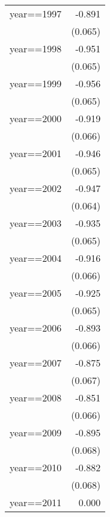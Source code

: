 \begin{table}[htbp]
\begin{tabular}{l*{1}{D{.}{.}{-1}}}
\addlinespace
year==1997          &      -0.891\sym{***}\\
                    &     (0.065)         \\
\addlinespace
year==1998          &      -0.951\sym{***}\\
                    &     (0.065)         \\
\addlinespace
year==1999          &      -0.956\sym{***}\\
                    &     (0.065)         \\
\addlinespace
year==2000          &      -0.919\sym{***}\\
                    &     (0.066)         \\
\addlinespace
year==2001          &      -0.946\sym{***}\\
                    &     (0.065)         \\
\addlinespace
year==2002          &      -0.947\sym{***}\\
                    &     (0.064)         \\
\addlinespace
year==2003          &      -0.935\sym{***}\\
                    &     (0.065)         \\
\addlinespace
year==2004          &      -0.916\sym{***}\\
                    &     (0.066)         \\
\addlinespace
year==2005          &      -0.925\sym{***}\\
                    &     (0.065)         \\
\addlinespace
year==2006          &      -0.893\sym{***}\\
                    &     (0.066)         \\
\addlinespace
year==2007          &      -0.875\sym{***}\\
                    &     (0.067)         \\
\addlinespace
year==2008          &      -0.851\sym{***}\\
                    &     (0.066)         \\
\addlinespace
year==2009          &      -0.895\sym{***}\\
                    &     (0.068)         \\
\addlinespace
year==2010          &      -0.882\sym{***}\\
                    &     (0.068)         \\
\addlinespace
year==2011          &       0.000         \\

\end{tabular}
\end{table}
